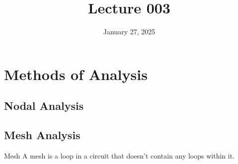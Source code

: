 \documentclass[12pt]{article}
\title{Lecture 003}
\date{January 27, 2025}
\begin{document}
\newpage

\section{Methods of Analysis}
\label{sec:methodsOfAnalysis}

\subsection{Nodal Analysis}
\label{ssec:nodalAnalysis}

\subsection{Mesh Analysis}
\label{ssec:meshAnalysis}

\begin{definition}{Mesh}
  A mesh is a loop in a circuit that doesn't contain any loops within it.
\end{definition}
\end{document}
